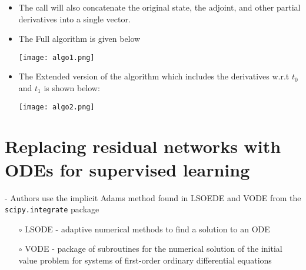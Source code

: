 \documentclass[10pt,a4paper]{article}
\begin{document}
\begin{itemize}
    \item The call will also concatenate the original state, the adjoint, and other partial derivatives into a single vector.
    \item The Full algorithm is given below
    \begin{center}
        \texttt{[image: algo1.png]}
    \end{center}
    \newpage
    \item The Extended version of the algorithm which includes the derivatives w.r.t $t_{0}$ and $t_{1}$ is shown below: 
    \begin{center}
        \texttt{[image: algo2.png]}
    \end{center}
\end{itemize}

\section{Replacing residual networks with ODEs for supervised learning}
\begin{description}[font=$\bullet$~\normalfont\scshape\color{blue!50!black}]
    \item[Software] -  Authors use the implicit Adams method found in LSOEDE and VODE from the \texttt{scipy.integrate} package
    \begin{itemize}
        \item[$\circ$] LSODE - adaptive numerical methods to find a solution to an ODE
        \item[$\circ$] VODE - package of subroutines for the numerical solution of the initial value problem for systems of first-order ordinary differential equations
    \end{itemize}
    
    
\end{description}
\end{document}
